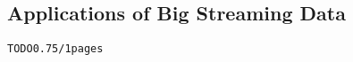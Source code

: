 \subsection{Applications of Big Streaming Data}
\begin{alltt}TODO\scriptsize 0.75/1 pages
\end{alltt}